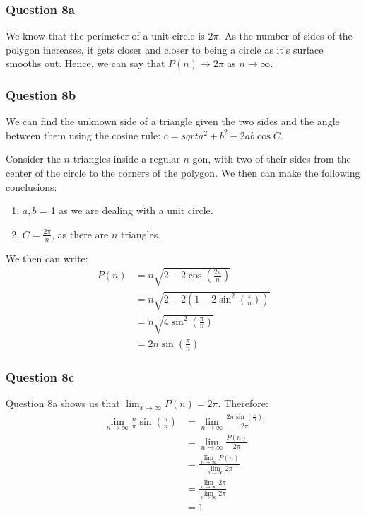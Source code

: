 \documentclass{article}
\begin{document}
\subsubsection*{Question 8a}
We know that the perimeter of a unit circle is $2\pi$. As the number of sides of the polygon increases, it gets closer and closer to being a circle as it's surface smooths out.  Hence, we can say that
$P(n)\to 2\pi$ as $n\to \infty$.
\subsubsection*{Question 8b}
We can find the unknown side of a triangle given the two sides and the angle between them using the cosine rule: $c=sqrt{a^2+b^2-2ab\cos C}$.

Consider the $n$ triangles inside a regular $n$-gon, with two of their sides from the center of the circle to the corners of the polygon. We then can make the following conclusions:
\begin{enumerate}
    \item $a,b$ = 1 as we are dealing with a unit circle.
    \item $C=\frac{2\pi}{n}$, as there are $n$ triangles.
\end{enumerate}
We then can write:
\begin{align*}
    P(n) & =n\sqrt{2-2\cos(\frac{2\pi}{n})}        \\
         & =n\sqrt{2-2(1-2\sin^2 (\frac{\pi}{n}))} \\
         & =n\sqrt{4\sin^2(\frac{\pi}{n})}         \\
         & =2n\sin(\frac{\pi}{n})
\end{align*}
\subsubsection*{Question 8c}
Question 8a shows us that $\lim_{x\to\infty}P(n)=2\pi$. Therefore:
\begin{align*}
    \lim_{n\to \infty}\frac{n}{\pi}\sin(\frac{\pi}{n}) & = \lim_{n\to \infty}\frac{2n\sin(\frac{\pi}{n})}{2\pi}    \\
                                                       & = \lim_{n\to \infty}\frac{P(n)}{2\pi}                     \\
                                                       & = \frac{\lim_{n\to \infty}P(n)}{\lim_{n\to \infty}2\pi}   \\
                                                       & = \frac{ \lim_{n\to \infty}2\pi}{ \lim_{n\to \infty}2\pi} \\
                                                       & = 1
\end{align*}
\end{document}
